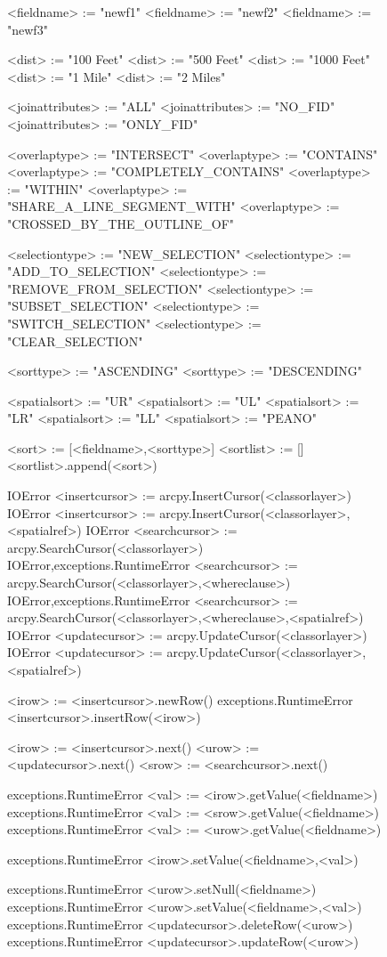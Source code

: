 \begin{figure}
{\begin{code}
<fieldname> := "newf1"
<fieldname> := "newf2"
<fieldname> := "newf3"

<dist> := "100 Feet"
<dist> := "500 Feet"
<dist> := "1000 Feet"
<dist> := "1 Mile"
<dist> := "2 Miles"

<joinattributes> := "ALL"
<joinattributes> := "NO\_FID"
<joinattributes> := "ONLY\_FID"

<overlaptype> := "INTERSECT"
<overlaptype> := "CONTAINS"
<overlaptype> := "COMPLETELY\_CONTAINS"
<overlaptype> := "WITHIN"
<overlaptype> := "SHARE\_A\_LINE\_SEGMENT\_WITH"
<overlaptype> := "CROSSED\_BY\_THE\_OUTLINE\_OF"

<selectiontype> := "NEW\_SELECTION"
<selectiontype> := "ADD\_TO\_SELECTION"
<selectiontype> := "REMOVE\_FROM\_SELECTION"
<selectiontype> := "SUBSET\_SELECTION"
<selectiontype> := "SWITCH\_SELECTION"
<selectiontype> := "CLEAR\_SELECTION"

<sorttype> := "ASCENDING"
<sorttype> := "DESCENDING"

<spatialsort> := "UR"
<spatialsort> := "UL"
<spatialsort> := "LR"
<spatialsort> := "LL"
<spatialsort> := "PEANO"

<sort> := [<fieldname>,<sorttype>]
<sortlist> := []
<sortlist>.append(<sort>)

{IOError} <insertcursor> := arcpy.InsertCursor(<classorlayer>)
{IOError} <insertcursor> := arcpy.InsertCursor(<classorlayer>,<spatialref>)
{IOError} <searchcursor> := arcpy.SearchCursor(<classorlayer>)
{IOError,exceptions.RuntimeError} <searchcursor> := arcpy.SearchCursor(<classorlayer>,<whereclause>)
{IOError,exceptions.RuntimeError} <searchcursor> := arcpy.SearchCursor(<classorlayer>,<whereclause>,<spatialref>)
{IOError} <updatecursor> := arcpy.UpdateCursor(<classorlayer>)
{IOError} <updatecursor> := arcpy.UpdateCursor(<classorlayer>,<spatialref>)

<irow> := <insertcursor>.newRow()
{exceptions.RuntimeError} <insertcursor>.insertRow(<irow>)

<irow> := <insertcursor>.next()
<urow> := <updatecursor>.next()
<srow> := <searchcursor>.next()

{exceptions.RuntimeError} <val> := <irow>.getValue(<fieldname>)
{exceptions.RuntimeError} <val> := <srow>.getValue(<fieldname>)
{exceptions.RuntimeError} <val> := <urow>.getValue(<fieldname>)

{exceptions.RuntimeError} <irow>.setValue(<fieldname>,<val>)

{exceptions.RuntimeError} <urow>.setNull(<fieldname>)
{exceptions.RuntimeError} <urow>.setValue(<fieldname>,<val>)
{exceptions.RuntimeError} <updatecursor>.deleteRow(<urow>)
{exceptions.RuntimeError} <updatecursor>.updateRow(<urow>)


\end{code}}
\end{figure}

